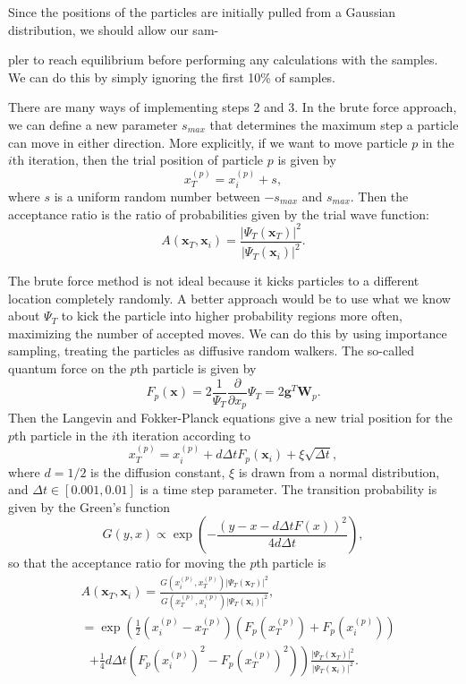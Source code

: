 \documentclass[prb,aps,twocolumn,showpacs,10pt]{revtex4-1}
\begin{document}
Since the positions of the particles are initially pulled from a Gaussian distribution, we should allow our sam-

\noindent pler to reach equilibrium before performing any calculations with the samples. We can do this by simply ignoring the first 10\% of samples. 

There are many ways of implementing steps 2 and 3. In the brute force approach, we can define a new parameter $s_{max}$ that determines the maximum step a particle can move in either direction. More explicitly, if we want to move particle $p$ in the $i$th iteration, then the trial position of particle $p$ is given by
\begin{equation}
x_T^{(p)} = x_i^{(p)} + s,
\end{equation}
where $s$ is a uniform random number between $-s_{max}$ and $s_{max}$. Then the acceptance ratio is the ratio of probabilities given by the trial wave function:
\begin{equation}
A(\bm{x}_T, \bm{x}_i) = \frac{|\Psi_T(\bm{x}_T)|^2}{|\Psi_T(\bm{x}_i)|^2}.
\end{equation}

The brute force method is not ideal because it kicks particles to a different location completely randomly. A better approach would be to use what we know about $\Psi_T$ to kick the particle into higher probability regions more often, maximizing the number of accepted moves. We can do this by using importance sampling, treating the particles as diffusive random walkers. The so-called quantum force on the $p$th particle is given by
\begin{equation}
F_p(\bm{x}) = 2 \frac{1}{\Psi_T} \frac{\partial}{\partial x_p} \Psi_T = 2 \bm{g}^T \bm{W}_p.
\end{equation}
Then the Langevin and Fokker-Planck equations give a new trial position for the $p$th particle in the $i$th iteration according to
\begin{equation}
x_T^{(p)} = x_i^{(p)} + d \Delta t F_p(\bm{x}_i)+\xi \sqrt{\Delta t},
\end{equation}
where $d = 1/2$ is the diffusion constant, $\xi$ is drawn from a normal distribution, and $\Delta t \in [0.001, 0.01]$ is a time step parameter. The transition probability is given by the Green's function
\begin{equation}
G(y,x) \propto \exp \left( - \frac{(y-x-d \Delta t F(x))^2}{4d \Delta t} \right),
\end{equation}
so that the acceptance ratio for moving the $p$th particle is
\begin{align}
&A(\bm{x}_T, \bm{x}_i) = \frac{G(x_i^{(p)},x_T^{(p)})|\Psi_T(\bm{x}_T)|^2}{G(x_T^{(p)},x_i^{(p)})|\Psi_T(\bm{x}_i)|^2},\\
&= \exp \left( \frac{1}{2}(x_i^{(p)}-x_T^{(p)}) \left(F_p(x_T^{(p)}) + F_p(x_i^{(p)}) \right) \right. \\
&\ \ \ \left. + \frac{1}{4} d \Delta t \left( F_p(x_i^{(p)})^2-F_p(x_T^{(p)})^2 \right) \right)  \frac{|\Psi_T(\bm{x}_T)|^2}{|\Psi_T(\bm{x}_i)|^2}.
\end{align}
\end{document}
